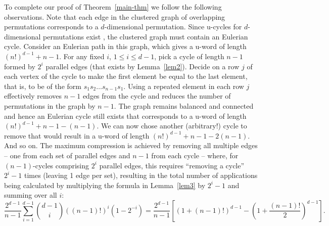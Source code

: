 \documentclass[12pt]{article}
\begin{document}
To complete our proof of Theorem~\ref{main-thm} we  follow the following observations. Note that each edge in the clustered graph of overlapping permutations corresponds to a $d$-dimensional permutation. Since u-cycles for $d$-dimensional permutations exist \cite{KQ}, the clustered graph must contain an Eulerian cycle.  Consider an Eulerian path in this graph, which gives a u-word of length $(n!)^{d-1}+n-1$. For any fixed $i$, $1\leq i\leq d-1$, pick a cycle of length $n-1$ formed by $2^i$ parallel edges (that exists by Lemma~\ref{lem2}). Decide on a row $j$ of each vertex of the cycle to make the first element be equal to the last element, that is, to be of the form $s_1s_2\ldots s_{n-1}s_1$. Using a repeated element in each row $j$ effectively removes $n-1$ edges from the cycle and reduces the number of permutations in the graph by $n-1$. The graph remains balanced and connected and hence an Eulerian cycle still exists that corresponds to a u-word of length $(n!)^{d-1}+n-1-(n-1)$. We can now chose another (arbitrary!) cycle to remove that would result in a u-word of length $(n!)^{d-1}+n-1-2(n-1)$. And so on. The maximum compression is achieved by removing all multiple edges -- one from each set of parallel edges and $n-1$ from each cycle -- where, for $(n-1)$-cycles comprising $2^i$ parallel edges, this requires ``removing a cycle'' $2^i-1$ times (leaving 1 edge per set), resulting in the total number of applications being calculated by multiplying the formula in Lemma~\ref{lem3} by $2^i-1$ and summing over all $i$:
$$\frac{2^{d-1}}{n-1}\sum_{i=1}^{d-1}{d-1\choose i}((n-1)!)^i(1-2^{-i})= \frac{2^{d-1}}{n-1}\left[(1+(n-1)!)^{d-1}-\left(1+\frac{(n-1)!}{2}\right)^{d-1}\right].$$
\end{document}
